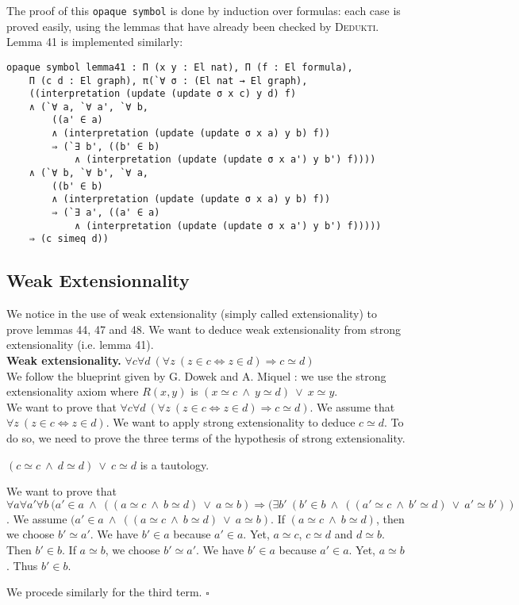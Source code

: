 \documentclass[submission,copyright,creativecommons]{eptcs}
\def\imp{\mathbin{\Rightarrow}}
\def\fa{{\forall}}
\def\conj{\mathbin{\wedge}}
\def\disj{\mathbin{\vee}}
\def\ex{{\exists}}
\newenvironment{proof}{\noindent {\em Proof.}}{\medskip}
\newcommand{\dedukti}{\textsc{Dedukti}}
\begin{document}
The proof of this \texttt{opaque symbol} is done by induction over formulas: each case is proved easily, using the lemmas that have already been checked by \dedukti. \\

Lemma 41 is implemented similarly:

\begin{lstlisting}
opaque symbol lemma41 : Π (x y : El nat), Π (f : El formula), 
	Π (c d : El graph), π(`∀ σ : (El nat → El graph), 
	((interpretation (update (update σ x c) y d) f)
	∧ (`∀ a, `∀ a', `∀ b, 
		((a' ∈ a) 
		∧ (interpretation (update (update σ x a) y b) f)) 
		⇒ (`∃ b', ((b' ∈ b) 
			∧ (interpretation (update (update σ x a') y b') f))))
	∧ (`∀ b, `∀ b', `∀ a, 
		((b' ∈ b) 
		∧ (interpretation (update (update σ x a) y b) f)) 
		⇒ (`∃ a', ((a' ∈ a) 
			∧ (interpretation (update (update σ x a') y b') f))))) 
	⇒ (c simeq d))
\end{lstlisting}

\subsection{Weak Extensionnality}

\label{extensionality}

We notice in \cite{zermodulo53} the use of weak extensionality (simply called extensionality) to prove lemmas 44, 47 and 48. We want to deduce weak extensionality from strong extensionality (i.e. lemma 41). \\

\textbf{Weak extensionality.} $\fa c\fa d~ (\fa z~ (z \in c \Leftrightarrow z \in d) \imp c \simeq d)$ \\

We follow the blueprint given by G. Dowek and A. Miquel \cite[see Proposition 1]{zermodulo} : we use the strong extensionality axiom where $R(x,y)$ is $(x \simeq c~\conj~y \simeq d)~\disj~x \simeq y$. \\

\begin{proof}
We want to prove that $\fa c\fa d~(\fa z~ (z \in c \Leftrightarrow z \in d) \imp c \simeq d)$. We assume that $\fa z~ (z \in c \Leftrightarrow z \in d)$. We want to apply strong extensionality to deduce $c \simeq d$. To do so, we need to prove the three terms of the hypothesis of strong extensionality.

$(c \simeq c~\conj~d \simeq d)~\disj~c \simeq d$ is a tautology.

We want to prove that $\fa a\fa a'\fa b~(a' \in a~\conj~((a \simeq c~\conj~b \simeq d)~\disj~a \simeq b) \imp (\ex b'~ (b' \in b~\conj~((a' \simeq c~\conj~b' \simeq d)~\disj~a' \simeq b'))$. We assume $(a' \in a~\conj~((a \simeq c~\conj~b \simeq d)~\disj~a \simeq b)$. If $(a \simeq c~\conj~b \simeq d)$, then we choose $b' \simeq a'$. We have $b' \in a$ because $a' \in a$. Yet, $a \simeq c$, $c \simeq d$ and $d \simeq b$. Then $b' \in b$. If $a \simeq b$, we choose $b' \simeq a'$. We have $b' \in a$ because $a' \in a$. Yet, $a \simeq b$. Thus $b' \in b$.

We procede similarly for the third term. $\square$
\end{proof}
\end{document}

